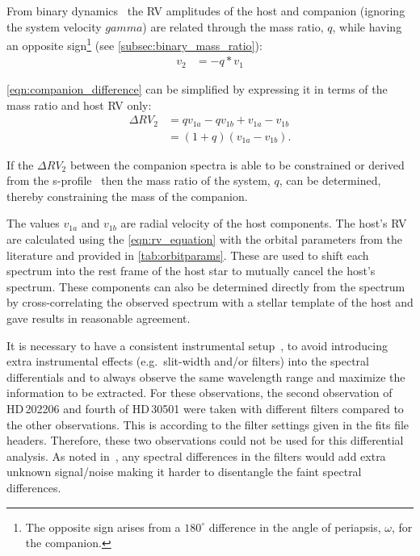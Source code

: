 From binary dynamics~\citep[e.g.][]{murray_keplerian_2010} the {RV} amplitudes of the host and companion (ignoring the system velocity $gamma$) are related through the mass ratio, \(q\), while having an opposite sign\footnote{The opposite sign arises from a \(180^\circ\) difference in the angle of periapsis, \(\omega\), for the companion.} (see \cref{subsec:binary_mass_ratio}):
\begin{align}
v_{2} &= -q * v_{1} \label{eqn:q_relation}
\end{align}

\cref{eqn:companion_difference} can be simplified by expressing it in terms of the mass ratio and host {RV} only:
\begin{align}
\Delta {RV}_{2} &= q v_{1a} - q v_{1b} + v_{1a} - v_{1b} \nonumber \\
&= (1 + q)(v_{1a} - v_{1b}).\label{eqn:companion_difference_simplified}
\end{align}

If the \(\Delta {RV}_2\) between the companion spectra is able to be constrained or derived from the s-profile~\citep[see][]{ferluga_separating_1997} then the mass ratio of the system, \(q\), can be determined, thereby constraining the mass of the companion.

The values \(v_{1a}\) and \(v_{1b}\) are radial velocity of the host components.
The host's {RV} are calculated using the \cref{eqn:rv_equation} with the orbital parameters from the literature and provided in \cref{tab:orbitparams}.
These are used to shift each spectrum into the rest frame of the host star to mutually cancel the host's spectrum.
These components can also be determined directly from the spectrum by cross-correlating the observed spectrum with a stellar template of the host and gave results in reasonable agreement.

It is necessary to have a consistent instrumental setup~\citep{ferluga_separating_1997,hadrava_disentangling_2009}, to avoid introducing extra instrumental effects (e.g.\ slit-width and/or filters) into the spectral differentials and to always observe the same wavelength range and maximize the information to be extracted.
For these observations, the second observation of {HD\,202206} and fourth of {HD\,30501} were taken with different filters compared to the other observations.
This is according to the filter settings given in the fits file headers.
Therefore, these two observations could not be used for this differential analysis.
As noted in~\citet{hadrava_disentangling_2009}, any spectral differences in the filters would add extra unknown signal/noise making it harder to disentangle the faint spectral differences.
